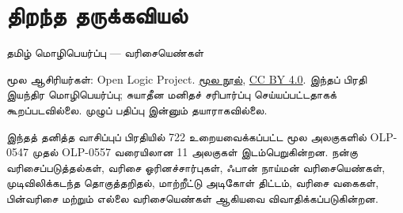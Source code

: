 \documentclass[11pt,a4paper,openany]{memoir}
\begin{document}
\raggedright
\pagestyle{plain}
\chapter*{திறந்த தருக்கவியல்}
\noindent தமிழ் மொழிபெயர்ப்பு — வரிசையெண்கள்

\noindent மூல ஆசிரியர்கள்: Open Logic Project.
\href{https://github.com/OpenLogicProject/OpenLogic}{மூல நூல்},
\href{https://creativecommons.org/licenses/by/4.0/}{CC BY 4.0}.
இந்தப் பிரதி இயந்திர மொழிபெயர்ப்பு; சுயாதீன மனிதச் சரிபார்ப்பு செய்யப்பட்டதாகக்
கூறப்படவில்லை. முழுப் பதிப்பு இன்னும் தயாராகவில்லை.

\noindent இந்தத் தனித்த வாசிப்புப் பிரதியில் 722 உறையவைக்கப்பட்ட மூல
அலகுகளில் OLP-0547 முதல் OLP-0557 வரையிலான 11 அலகுகள் இடம்பெறுகின்றன.
நன்கு வரிசைப்படுத்தல்கள், வரிசை ஓரினச்சார்புகள், ஃபான் நாய்மன்
வரிசையெண்கள், முடிவிலிக்கடந்த தொகுத்தறிதல், மாற்றீட்டு அடிகோள் திட்டம்,
வரிசை வகைகள், பின்வரிசை மற்றும் எல்லை வரிசையெண்கள் ஆகியவை
விவாதிக்கப்படுகின்றன.

\clearpage
\tableofcontents*



\end{document}
